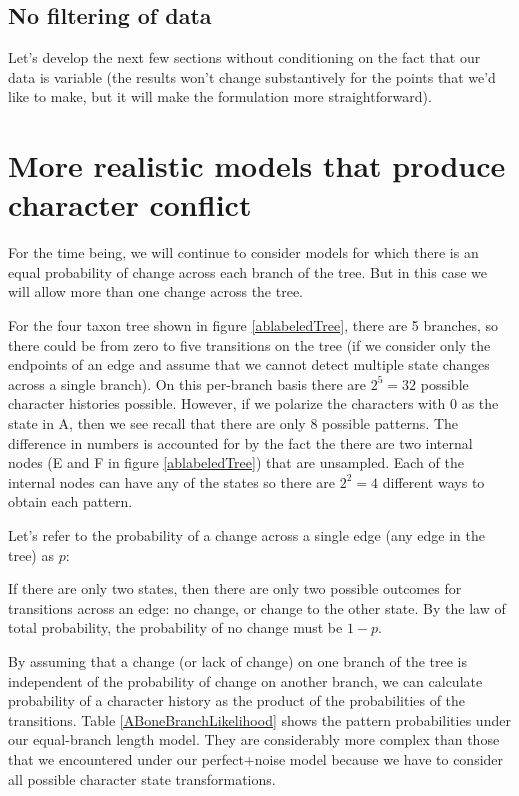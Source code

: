 \documentclass[11pt]{article}
\begin{document}
\subsection*{No filtering of data}
Let's develop the next few sections without conditioning on the fact that our data is variable 
(the results won't change substantively for the points that we'd like to make, but it will make
the formulation more straightforward).

\section*{More realistic models that produce character conflict}
For the time being, we will continue to consider models for which there is an equal probability 
of change across each branch of the tree.
But in this case we will allow more than one change across the tree.

For the four taxon tree shown in figure \ref{ablabeledTree}, there are 5 branches, so there could be
from zero to five transitions on the tree (if we consider only the endpoints of an edge and assume
that we cannot detect multiple state changes across a single branch).
On this per-branch basis  there are $2^5=32$ possible character histories possible.
However, if we polarize the characters with 0 as the state in A, then we see recall that there are
only 8 possible patterns.
The difference in numbers is accounted for by the fact the there are two internal nodes (E and F in figure \ref{ablabeledTree}) that are unsampled. 
Each of the internal nodes can have any of the states so there are $2^2 = 4$ different ways to 
obtain each pattern.

Let's refer to the probability of a change across a single edge (any edge in the tree) as $p$:

If there are only two states, then there are only two possible outcomes for transitions across
an edge: no change, or change to the other state.
By the law of total probability, the probability of no change must be $1-p$.

By assuming that a change (or lack of change) on one branch of the tree is independent of the
probability of change on another branch, we can calculate probability of a character history as the 
product of the probabilities of the transitions.
Table \ref{ABoneBranchLikelihood} shows the pattern probabilities under our equal-branch length
model.
They are considerably more complex than those that we encountered under our perfect+noise model
because we have to consider all possible character state transformations.
\end{document}
